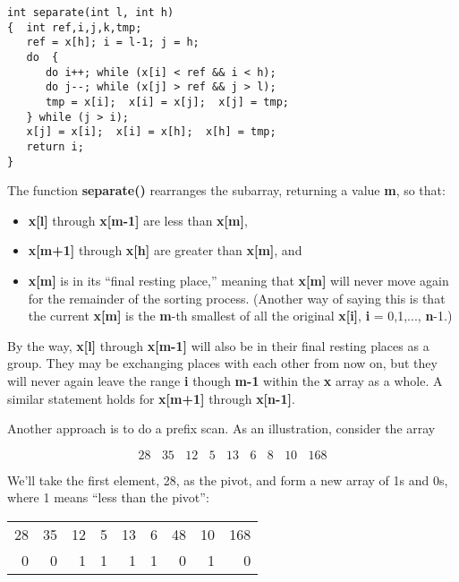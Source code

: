 \begin{Verbatim}[fontsize=\relsize{-2}]
int separate(int l, int h)
{  int ref,i,j,k,tmp;
   ref = x[h]; i = l-1; j = h;
   do  {
      do i++; while (x[i] < ref && i < h);
      do j--; while (x[j] > ref && j > l);
      tmp = x[i];  x[i] = x[j];  x[j] = tmp;
   } while (j > i);
   x[j] = x[i];  x[i] = x[h];  x[h] = tmp;
   return i;
}
\end{Verbatim}

The function {\bf separate()} rearranges the subarray, returning a value
{\bf m}, so that:

\begin{itemize}

\item {\bf x[l]} through {\bf x[m-1]} are less than {\bf x[m]},

\item {\bf x[m+1]} through {\bf x[h]} are greater than {\bf x[m]}, and

\item {\bf x[m]} is in its ``final resting place,'' meaning that {\bf
x[m]} will never move again for the remainder of the sorting process.
(Another way of saying this is that the current {\bf x[m]} is the {\bf
m}-th smallest of all the original {\bf x[i]}, {\bf i} = 0,1,...,{\bf
n}-1.)

\end{itemize}

By the way, {\bf x[l]} through {\bf x[m-1]} will also be in their final
resting places as a group.  They may be exchanging places with each
other from now on, but they will never again leave the range {\bf i}
though {\bf m-1} within the {\bf x} array as a whole.  A similar
statement holds for {\bf x[m+1]} through {\bf x[n-1]}.

Another approach is to do a prefix scan.  As an illustration, consider
the array

\begin{equation}
28 ~~~~ 35 ~~~~ 12  ~~~~ 5 ~~~~ 13  ~~~~ 6  ~~~~ 8 ~~~~ 10  ~~~~ 168
\end{equation}

We'll take the first element, 28, as the pivot, and form a new array of
1s and 0s, where 1 means ``less than the pivot'':

\begin{tabular}{rrrrrrrrr}
28 & 35 & 12  & 5 & 13  & 6  & 48 & 10 & 168 \\
0  &  0 &  1  & 1 &  1  & 1  & 0  &  1 &  0 \\
\end{tabular}

